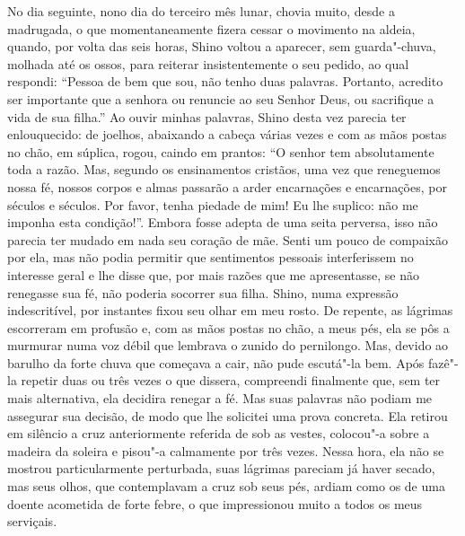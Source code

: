 No dia seguinte, nono dia do terceiro mês lunar, chovia muito, desde a madrugada,
o que momentaneamente fizera cessar o movimento na aldeia, quando, por
volta das seis horas, Shino voltou a aparecer, sem guarda"-chuva,
molhada até os ossos, para reiterar insistentemente o seu pedido, ao
qual respondi: ``Pessoa de bem que sou, não tenho duas palavras.
Portanto, acredito ser importante que a senhora ou renuncie ao seu
Senhor Deus, ou sacrifique a vida de sua filha.'' Ao ouvir minhas
palavras, Shino desta vez parecia ter enlouquecido: de joelhos,
abaixando a cabeça várias vezes e com as mãos postas no chão, em
súplica, rogou, caindo em prantos: ``O senhor tem absolutamente toda a
razão. Mas, segundo os ensinamentos cristãos, uma vez que reneguemos
nossa fé, nossos corpos e almas passarão a arder encarnações e
encarnações, por séculos e séculos. Por favor, tenha piedade de mim! Eu
lhe suplico: não me imponha esta condição!''. Embora fosse adepta de uma
seita perversa, isso não parecia ter mudado em nada seu coração de mãe.
Senti um pouco de compaixão por ela, mas não podia permitir que
sentimentos pessoais interferissem no interesse geral e lhe disse que,
por mais razões que me apresentasse, se não renegasse sua fé, não
poderia socorrer sua filha. Shino, numa expressão indescritível, por
instantes fixou seu olhar em meu rosto. De repente, as lágrimas
escorreram em profusão e, com as mãos postas no chão, a meus pés, ela
se pôs a murmurar numa voz débil que lembrava o zunido do pernilongo.
Mas, devido ao barulho da forte chuva que começava a cair, não pude
escutá"-la bem. Após fazê"-la repetir duas ou três vezes o que dissera,
compreendi finalmente que, sem ter mais alternativa, ela decidira
renegar a fé. Mas suas palavras não podiam me assegurar sua decisão, de
modo que lhe solicitei uma prova concreta. Ela retirou em silêncio a
cruz anteriormente referida de sob as vestes, colocou"-a sobre a madeira
da soleira e pisou"-a calmamente por três vezes. Nessa hora, ela não se
mostrou particularmente perturbada, suas lágrimas pareciam já haver
secado, mas seus olhos, que contemplavam a cruz sob seus pés, ardiam
como os de uma doente acometida de forte febre, o que impressionou
muito a todos os meus serviçais.


